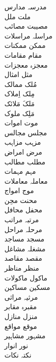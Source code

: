 \documentclass[a4paper]{article}
\begin{document}
\begin{multicols}{3}
\begin{tabbing}
مدرسہ \> مدارس\\
ملت \> ملل\\
مصیبت \> مصائب\\
مراسلہ \> مراسلات\\
ممکن \> ممکنات\\
مقام \> مقامات\\
معجزہ \> معجزات\\
مثل \> امثال\\
مُلک \> ممالک\\
مِلک \> اِملاک\\
مَلکَ \> مَلائک\\
مَلِک \> ملوک\\
موت \> اموات\\
مجلس \> مجالس\\
مزہب \> مزاہب\\
مرض \> امراض\\
مطلب \> مطالب\\
مہم \> مہمات\\
معاملہ \> معاملات\\
موج \> امواج\\
محنت \> محِن\\
محفل \> محافل\\
مرتبہ \> مراتب\\
مرحلہ \> مراحل\\
مسجد \> مساجد\\
مشغلہ \> مشاغل\\
مقصد \> مقاصد\\
منظر \> مناظر\\
ماکول \> ماکولات\\
مسکین \> مساکین\\
مرثیہ \> مراثی\\
مقبرہ \> مقابر\\
منزل \> منازل\\
موقع \> مواقع\\
مشہور \> مشاہیر\\
نور \> انوار\\
نکتہ \> نکات\\
\end{tabbing}
\end{multicols}
\end{document}
